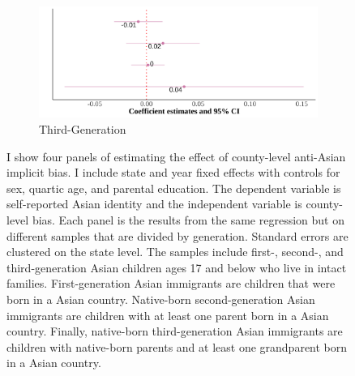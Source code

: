 \begin{center}
\begin{figure}[!htb]
\begin{subfigure}{.48\textwidth}
\caption{Third-Generation}
\centering
\includegraphics[width=.9\linewidth]{county-skin-iat-regression-third-gen.png}
\end{subfigure}
\caption*{\footnotesize{I show four panels of estimating the effect of county-level anti-Asian implicit bias. I include state and year fixed effects with controls for sex, quartic age, and parental education. The dependent variable is self-reported Asian identity and the independent variable is county-level bias. Each panel is the results from the same regression but on different samples that are divided by generation. Standard errors are clustered on the state level. The samples include first-, second-, and third-generation Asian children ages 17 and below who live in intact families. First-generation Asian immigrants are children that were born in a Asian country. Native-born second-generation Asian immigrants are children with at least one parent born in a Asian country. Finally, native-born third-generation Asian immigrants are children with native-born parents and at least one grandparent born in a Asian country.}}
\end{figure}
\end{center}

\pagebreak
\newpage

